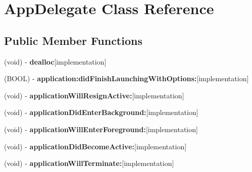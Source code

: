 \hypertarget{interface_app_delegate}{
\section{\-App\-Delegate \-Class \-Reference}
\label{interface_app_delegate}
}
\subsection*{\-Public \-Member \-Functions}
\begin{DoxyCompactItemize}
\item 
\hypertarget{interface_app_delegate_ac6f427953538cd2c98156824a844ba11}{
(void) -\/ {\bfseries dealloc}{\ttfamily  \mbox{[}implementation\mbox{]}}}
\label{interface_app_delegate_ac6f427953538cd2c98156824a844ba11}

\item 
\hypertarget{interface_app_delegate_a2ca637e0d5db62251b5881aa16897f75}{
(\-B\-O\-O\-L) -\/ {\bfseries application\-:did\-Finish\-Launching\-With\-Options\-:}{\ttfamily  \mbox{[}implementation\mbox{]}}}
\label{interface_app_delegate_a2ca637e0d5db62251b5881aa16897f75}

\item 
\hypertarget{interface_app_delegate_ad4e9549671ce8c4fc31bd6e4836b5a91}{
(void) -\/ {\bfseries application\-Will\-Resign\-Active\-:}{\ttfamily  \mbox{[}implementation\mbox{]}}}
\label{interface_app_delegate_ad4e9549671ce8c4fc31bd6e4836b5a91}

\item 
\hypertarget{interface_app_delegate_a26d9be79224184ef974a09c1793eb360}{
(void) -\/ {\bfseries application\-Did\-Enter\-Background\-:}{\ttfamily  \mbox{[}implementation\mbox{]}}}
\label{interface_app_delegate_a26d9be79224184ef974a09c1793eb360}

\item 
\hypertarget{interface_app_delegate_ad9916739a43349edad2877110be31059}{
(void) -\/ {\bfseries application\-Will\-Enter\-Foreground\-:}{\ttfamily  \mbox{[}implementation\mbox{]}}}
\label{interface_app_delegate_ad9916739a43349edad2877110be31059}

\item 
\hypertarget{interface_app_delegate_a73aa814398c205f47f21ed59b616e492}{
(void) -\/ {\bfseries application\-Did\-Become\-Active\-:}{\ttfamily  \mbox{[}implementation\mbox{]}}}
\label{interface_app_delegate_a73aa814398c205f47f21ed59b616e492}

\item 
\hypertarget{interface_app_delegate_ae08d55e0d58680354fceb7c8341055eb}{
(void) -\/ {\bfseries application\-Will\-Terminate\-:}{\ttfamily  \mbox{[}implementation\mbox{]}}}
\label{interface_app_delegate_ae08d55e0d58680354fceb7c8341055eb}

\end{DoxyCompactItemize}
